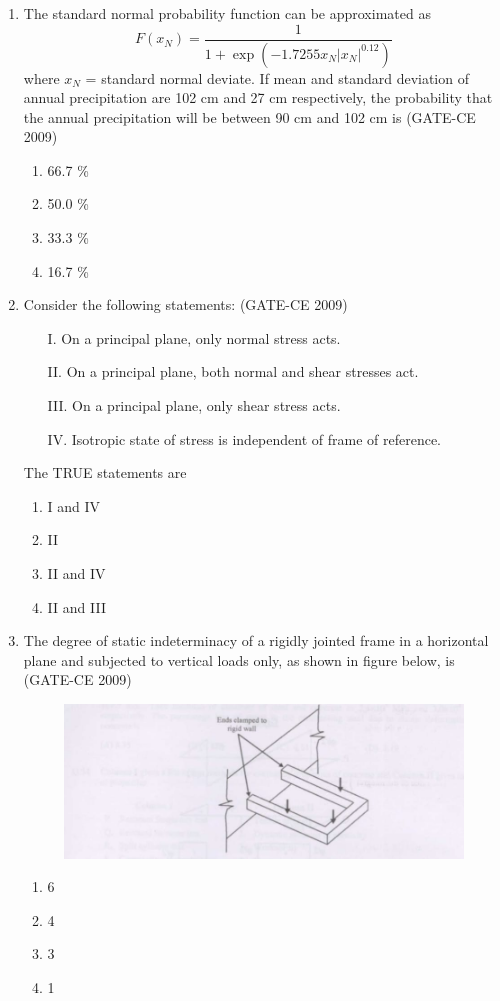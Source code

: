 \documentclass[journal,12pt,onecolumn]{article}
\theoremstyle{remark}
\begin{document}
\begin{enumerate}
    \item The standard normal probability function can be approximated as
    \[ F(x_N) = \frac{1}{1+\exp\left(-1.7255 x_N | x_N |^{0.12}\right)} \]
    where $x_N$ = standard normal deviate. If mean and standard deviation of annual precipitation are 102 cm and 27 cm respectively, the probability that the annual precipitation will be between 90 cm and 102 cm is (GATE-CE 2009)
    \begin{enumerate}
        \item 66.7 \% 
        \item 50.0 \% 
        \item 33.3 \% 
        \item 16.7 \%
    \end{enumerate}
    
    \item Consider the following statements: (GATE-CE 2009)
    \begin{itemize}
        \item[I.] On a principal plane, only normal stress acts.
        \item[II.] On a principal plane, both normal and shear stresses act.
        \item[III.] On a principal plane, only shear stress acts.
        \item[IV.] Isotropic state of stress is independent of frame of reference.
    \end{itemize}
    The TRUE statements are
    \begin{enumerate}
        \item I and IV 
        \item II 
        \item II and IV 
        \item II and III
    \end{enumerate}
    
    \item The degree of static indeterminacy of a rigidly jointed frame in a horizontal plane and subjected to vertical loads only, as shown in figure below, is (GATE-CE 2009)
    \begin{figure}[H]
    \centering
    \includegraphics[width=0.7\columnwidth]{figs/image.jpg}
    \caption{}
    \label{fig:placeholder}
    \end{figure}
    \begin{enumerate}
        \item 6 
        \item 4 
        \item 3 
        \item 1
    \end{enumerate}
    

\end{enumerate}
\end{document}
